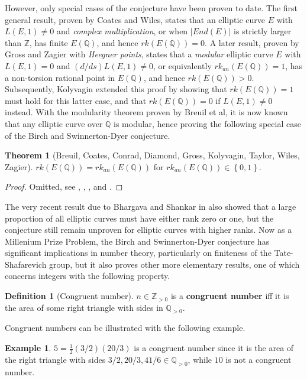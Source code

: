 \documentclass{article}
\newcommand{\Z}{\mathbb{Z}}
\newcommand{\Q}{\mathbb{Q}}
\newcommand{\rb}[1]{\left( #1 \right)}
\newcommand{\cb}[1]{\left\{ #1 \right\}}
\newcommand{\abs}[1]{\left\lvert #1 \right\rvert}
\theoremstyle{definition}\newtheorem*{definition}{Definition}
\theoremstyle{definition}\newtheorem*{example}{Example}
\theoremstyle{definition}\newtheorem*{remark}{Remark}
\newtheorem{theorem}[proposition]{Theorem}
\begin{document}
However, only special cases of the conjecture have been proven to date. The first general result, proven by Coates and Wiles, states that an elliptic curve $ E $ with $ L\rb{E, 1} \ne 0 $ and \emph{complex multiplication}, or when $ \abs{End\rb{E}} $ is strictly larger than $ \Z $, has finite $ E\rb{\Q} $, and hence $ rk\rb{E\rb{\Q}} = 0 $. A later result, proven by Gross and Zagier with \emph{Heegner points}, states that a \emph{modular} elliptic curve $ E $ with $ L\rb{E, 1} = 0 $ and $ \rb{d / ds}L\rb{E, 1} \ne 0 $, or equivalently $ rk_{an}\rb{E\rb{\Q}} = 1 $, has a non-torsion rational point in $ E\rb{\Q} $, and hence $ rk\rb{E\rb{\Q}} > 0 $. Subsequently, Kolyvagin extended this proof by showing that $ rk\rb{E\rb{\Q}} = 1 $ must hold for this latter case, and that $ rk\rb{E\rb{\Q}} = 0 $ if $ L\rb{E, 1} \ne 0 $ instead. With the modularity theorem proven by Breuil et al, it is now known that any elliptic curve over $ \Q $ is modular, hence proving the following special case of the Birch and Swinnerton-Dyer conjecture.

\begin{theorem}[Breuil, Coates, Conrad, Diamond, Gross, Kolyvagin, Taylor, Wiles, Zagier]
$ rk\rb{E\rb{\Q}} = rk_{an}\rb{E\rb{\Q}} $ for $ rk_{an}\rb{E\rb{\Q}} \in \cb{0, 1} $.
\end{theorem}

\begin{proof}
Omitted, see \cite{bsd1}, \cite{bsd2}, \cite{bsd3}, and \cite{modularity}.
\end{proof}

The very recent result due to Bhargava and Shankar in \cite{rankaverage} also showed that a large proportion of all elliptic curves must have either rank zero or one, but the conjecture still remain unproven for elliptic curves with higher ranks. Now as a Millenium Prize Problem, the Birch and Swinnerton-Dyer conjecture has significant implications in number theory, particularly on finiteness of the Tate-Shafarevich group, but it also proves other more elementary results, one of which concerns integers with the following property.

\begin{definition}[Congruent number]
$ n \in \Z_{> 0} $ is a \textbf{congruent number} iff it is the area of some right triangle with sides in $ \Q_{> 0} $.
\end{definition}

Congruent numbers can be illustrated with the following example.

\begin{example}
$ 5 = \tfrac{1}{2}\rb{3 / 2}\rb{20 / 3} $ is a congruent number since it is the area of the right triangle with sides $ 3 / 2, 20 / 3, 41 / 6 \in \Q_{> 0} $, while $ 10 $ is not a congruent number.
\end{example}
\end{document}

